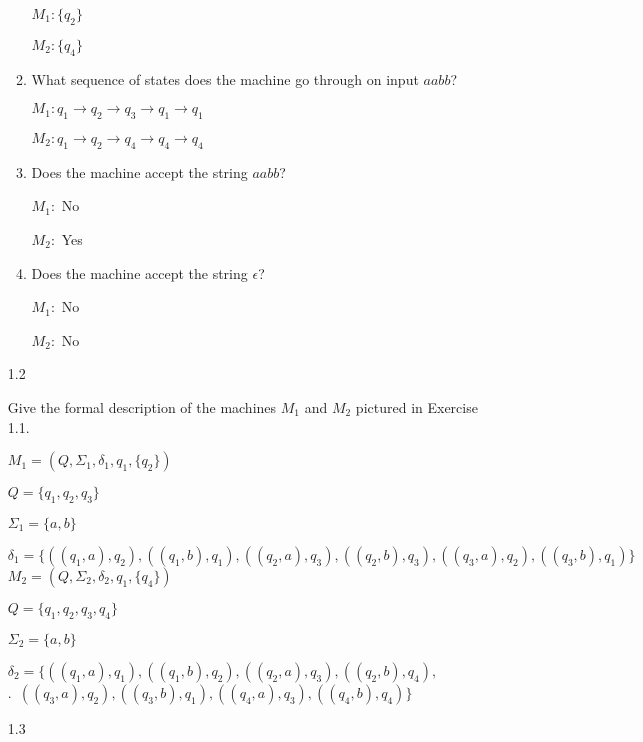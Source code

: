 \begin{enumerate}
\begin{enumerate}
                    $M_1: \{q_2\}$
                    
                    $M_2: \{q_4\}$
              \item What sequence of states does the machine go through on input $aabb$?
                    
                    $M_1: q_1 \rightarrow q_2 \rightarrow q_3 \rightarrow q_1 \rightarrow q_1$
                    
                    $M_2: q_1 \rightarrow q_2 \rightarrow q_4 \rightarrow q_4 \rightarrow q_4$
              \item Does the machine accept the string $aabb$?
                    
                    $M_1:$ No
                    
                    $M_2:$ Yes
              \item Does the machine accept the string $\epsilon$?
                    
                    $M_1:$ No
                    
                    $M_2:$ No
          \end{enumerate}
          
    \item[1.2]
    
          Give the formal description of the machines $M_1$ and $M_2$ pictured in Exercise 1.1.
          
          $M_1 = (Q, \Sigma_1, \delta_1, q_1, \{q_2\})$
          
          $Q = \{q_1, q_2, q_3\}$
          
          $\Sigma_1 = \{a, b\}$
          
          $\delta_1 = \{((q_1, a), q_2), ((q_1, b), q_1), ((q_2, a), q_3), ((q_2, b), q_3), ((q_3, a), q_2), ((q_3, b), q_1)\}$\\
          
          $M_2 = (Q, \Sigma_2, \delta_2, q_1, \{q_4\})$
          
          $Q = \{q_1, q_2, q_3, q_4\}$
          
          $\Sigma_2 = \{a, b\}$
          
          $\delta_2 = \{((q_1, a), q_1), ((q_1, b), q_2), ((q_2, a), q_3), ((q_2, b), q_4),$\\
          .\,\,\,\qquad$((q_3, a), q_2), ((q_3, b), q_1), ((q_4, a), q_3), ((q_4, b), q_4)\}$
          
    \item[1.3]
    

\end{enumerate}
